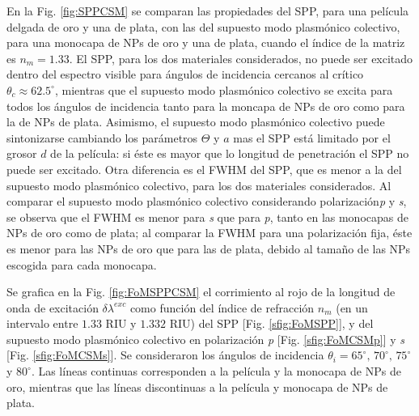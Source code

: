 En la Fig. \ref{fig:SPPCSM} se comparan las propiedades del SPP, para una película delgada de oro y una de plata, con las del supuesto modo  plasmónico colectivo, para una monocapa de NPs de oro y una de plata, cuando el índice de la matriz es $n_m=1.33$. El SPP, para los dos materiales considerados, no puede ser excitado dentro del espectro visible para ángulos de incidencia cercanos al crítico $\theta_c\approx 62.5^\circ$, mientras que el supuesto modo  plasmónico colectivo se excita para todos los ángulos de incidencia tanto para la moncapa de NPs de oro como para la de NPs de plata. Asimismo, el supuesto modo  plasmónico colectivo puede sintonizarse  cambiando los parámetros $\Theta$ y $a$ mas el SPP está limitado por el grosor $d$ de la película: si éste es mayor que lo longitud de penetración el SPP no puede ser excitado. Otra diferencia es el FWHM del SPP, que es menor a la del supuesto modo  plasmónico colectivo, para los dos materiales considerados. Al comparar el supuesto modo  plasmónico colectivo considerando polarización\emph{p} y \emph{s},  se observa  que el FWHM es menor para \emph{s} que para \emph{p}, tanto en las monocapas de NPs de oro como de plata; al comparar la FWHM para una polarización fija, éste es menor para las NPs de oro que para las de plata, debido al tamaño de las NPs escogida para cada monocapa.

Se grafica en la Fig. \ref{fig:FoMSPPCSM} el corrimiento al rojo de la longitud de onda de excitación $\delta\lambda^{exc}$ como función del índice de refracción $n_m$ (en un intervalo entre $1.33$ RIU y $1.332$ RIU)  del SPP [Fig. \ref{sfig:FoMSPP}], y del supuesto modo  plasmónico colectivo en polarización \emph{p} [Fig. \ref{sfig:FoMCSMp}] y \emph{s} [Fig. \ref{sfig:FoMCSMs}]. Se consideraron los ángulos de incidencia $\theta_i=65^\circ,\, 70^\circ,\, 75^\circ$ y $80^\circ$. Las líneas continuas corresponden a la película y la monocapa de NPs de oro, mientras que las líneas discontinuas a la película y monocapa de NPs de plata. 

